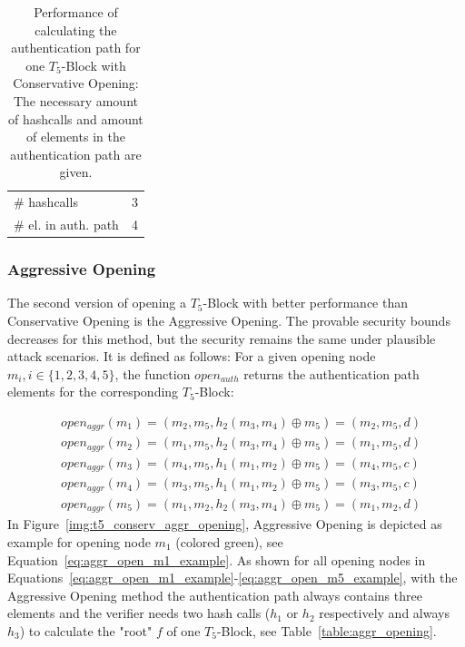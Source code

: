 \begin{table}
\centering
\begin{tabular}{l c} 
 \hline\noalign{\smallskip}
 \multicolumn{2}{c}{\textbf{Conservative Opening}} \\
 \hline\noalign{\smallskip}
 \# hashcalls & 3 \\
 \# el. in auth. path & 4 \\
 \hline
\end{tabular}
\caption{Performance of calculating the authentication path for one $T_5$-Block with Conservative Opening: The necessary amount of hashcalls and amount of elements in the authentication path are given.}
\label{table:conserv_opening}
\end{table}

\subsubsection{Aggressive Opening}
\label{sec:aggr_opening}
The second version of opening a $T_5$-Block with better performance than Conservative Opening is the Aggressive Opening. The provable security bounds decreases for this method, but the security remains the same under plausible attack scenarios. It is defined as follows: For a given opening node $m_i, i \in \{1,2,3,4,5\}$, the function $open_{auth}$ returns the authentication path elements for the corresponding $T_5$-Block:

\begin{align}
&open_{aggr}(m_1) = (m_2, m_5, h_2(m_3,m_4) \oplus m_5) = (m_2, m_5, d) \label{eq:aggr_open_m1_example} \\
&open_{aggr}(m_2) = (m_1, m_5, h_2(m_3,m_4) \oplus m_5) = (m_1, m_5, d) \\
&open_{aggr}(m_3) = (m_4, m_5, h_1(m_1, m_2) \oplus m_5) = (m_4, m_5, c) \\ 
&open_{aggr}(m_4) = (m_3, m_5, h_1(m_1, m_2) \oplus m_5) = (m_3, m_5, c) \\ 
&open_{aggr}(m_5) = (m_1, m_2, h_2(m_3, m_4) \oplus m_5) = (m_1, m_2, d) \label{eq:aggr_open_m5_example}
\end{align}
In Figure~\ref{img:t5_conserv_aggr_opening}, Aggressive Opening is depicted as example for opening node $m_1$ (colored green), see Equation~\ref{eq:aggr_open_m1_example}. 
As shown for all opening nodes in Equations~\ref{eq:aggr_open_m1_example}-\ref{eq:aggr_open_m5_example}, with the Aggressive Opening method the authentication path always contains three elements and the verifier needs two hash calls ($h_1$ or $h_2$ respectively and always $h_3$) to calculate the "root" $f$ of one $T_5$-Block, see Table~\ref{table:aggr_opening}.

